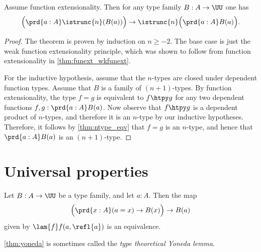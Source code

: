 \begin{thm}
Assume function extensionality. Then for any type family $B:A\to\UU$ one has
\begin{equation*}
\Big(\prd{a:A}\istrunc{n}(B(a))\Big)\to \istrunc{n}\Big(\prd{a:A}B(a)\Big).
\end{equation*}
\end{thm}

\begin{proof}
The theorem is proven by induction on $n\geq -2$. The base case is just the weak function extensionality principle, which was shown to follow from function extensionality in \autoref{thm:funext_wkfunext}.

For the inductive hypothesis, assume that the $n$-types are closed under dependent function types. Assume that $B$ is a family of $(n+1)$-types. By function extensionality, the type $f=g$ is equivalent to $f\htpy g$ for any two dependent functions $f,g:\prd{a:A}B(a)$. Now observe that $f\htpy g$ is a dependent product of $n$-types, and therefore it is an $n$-type by our inductive hypotheses. Therefore, it follows by \autoref{thm:ntype_eqv} that $f=g$ is an $n$-type, and hence that $\prd{a:A}B(a)$ is an $(n+1)$-type.
\end{proof}

\section{Universal properties}

\begin{thm}\label{thm:yoneda}
Let $B:A\to\UU$ be a type family, and let $a:A$. Then the map
\begin{equation*}
\Big(\prd{x:A} (a=x)\to B(x)\Big)\to B(a)
\end{equation*}
given by $\lam{f} f(a,\refl{a})$ is an equivalence. 
\end{thm}

\begin{rmk}
\autoref{thm:yoneda} is sometimes called the \emph{type theoretical Yoneda lemma}.
\end{rmk}

